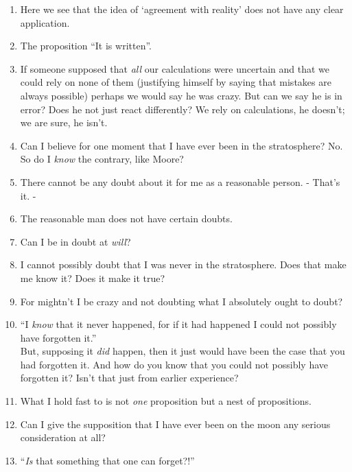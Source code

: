 \documentclass{book}
\begin{document}
\begin{enumerate}
\item
Here we see that the idea of `agreement with reality' does not have any clear
application.

\item
The proposition ``It is written''.

\item
If someone supposed that \emph{all} our calculations were uncertain and that we
could rely on none of them (justifying himself by saying that mistakes are
always possible) perhaps we would say he was crazy. But can we say he is in
error?  Does he not just react differently? We rely on calculations, he
doesn't; we are sure, he isn't.

\item
Can I believe for one moment that I have ever been in the stratosphere? No. So
do I \emph{know} the contrary, like Moore?

\item
There cannot be any doubt about it for me as a reasonable person. - That's it.
-

\item
The reasonable man does not have certain doubts.

\item
Can I be in doubt at \emph{will}?

\item
I cannot possibly doubt that I was never in the stratosphere. Does that make me
know it? Does it make it true?

\item
For mightn't I be crazy and not doubting what I absolutely ought to doubt?

\item
``I \emph{know} that it never happened, for if it had happened I could not
possibly have forgotten it.'' \\
But, supposing it \emph{did} happen, then it just would have been the case that
you had forgotten it. And how do you know that you could not possibly have
forgotten it? Isn't that just from earlier experience?

\item
What I hold fast to is not \emph{one} proposition but a nest of propositions.

\item
Can I give the supposition that I have ever been on the moon any serious
consideration at all?

\item
``\emph{Is} that something that one can forget?!''


\end{enumerate}
\end{document}
